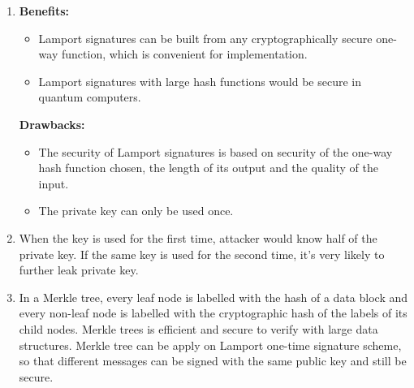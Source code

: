 \documentclass[11pt,a4paper]{article}
\begin{document}
\begin{enumerate}
\item \textbf{Benefits:}
	\begin{itemize}
	\item Lamport signatures can be built from any cryptographically secure one-way function, which is convenient for implementation.
	\item Lamport signatures with large hash functions would be secure in quantum computers.
	\end{itemize}
\par \textbf{Drawbacks:}
	\begin{itemize}
	\item The security of Lamport signatures is based on security of the one-way hash function chosen, the length of its output and the quality of the input.
	\item The private key can only be used once.
	\end{itemize}

\item When the key is used for the first time, attacker would know half of the private key. If the same key is used for the second time, it's very likely to further leak private key.

\item In a Merkle tree, every leaf node is labelled with the hash of a data block and every non-leaf node is labelled with the cryptographic hash of the labels of its child nodes. Merkle trees is efficient and secure to verify with large data structures. Merkle tree can be apply on Lamport one-time signature scheme, so that different messages can be signed with the same public key and still be secure.
\end{enumerate}
\end{document}
